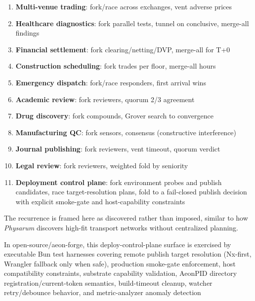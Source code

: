 \documentclass[
]{article}
\providecommand{\tightlist}{%
  \setlength{\itemsep}{0pt}\setlength{\parskip}{0pt}}
\begin{document}
\begin{enumerate}
\def\labelenumi{\arabic{enumi}.}
\tightlist
\item
  \textbf{Multi-venue trading}: fork/race across exchanges, vent adverse
  prices\\
\item
  \textbf{Healthcare diagnostics}: fork parallel tests, tunnel on
  conclusive, merge-all findings\\
\item
  \textbf{Financial settlement}: fork clearing/netting/DVP, merge-all
  for T+0\\
\item
  \textbf{Construction scheduling}: fork trades per floor, merge-all
  hours\\
\item
  \textbf{Emergency dispatch}: fork/race responders, first arrival
  wins\\
\item
  \textbf{Academic review}: fork reviewers, quorum 2/3 agreement\\
\item
  \textbf{Drug discovery}: fork compounds, Grover search to
  convergence\\
\item
  \textbf{Manufacturing QC}: fork sensors, consensus (constructive
  interference)\\
\item
  \textbf{Journal publishing}: fork reviewers, vent timeout, quorum
  verdict\\
\item
  \textbf{Legal review}: fork reviewers, weighted fold by seniority\\
\item
  \textbf{Deployment control plane}: fork environment probes and publish
  candidates, race target-resolution plans, fold to a fail-closed
  publish decision with explicit smoke-gate and host-capability
  constraints
\end{enumerate}

The recurrence is framed here as discovered rather than imposed, similar
to how \emph{Physarum} discovers high-fit transport networks without
centralized planning.

In open-source/aeon-forge, this deploy-control-plane surface is
exercised by executable Bun test harnesses covering remote publish
target resolution (Nx-first, Wrangler fallback only when safe),
production smoke-gate enforcement, host compatibility constraints,
substrate capability validation, AeonPID directory
registration/current-token semantics, build-timeout cleanup, watcher
retry/debounce behavior, and metric-analyzer anomaly detection
\end{document}
